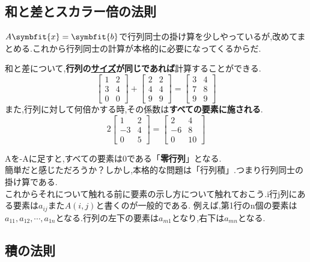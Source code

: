 \subsection{和と差とスカラー倍の法則}
$A\symbfit{x}=\symbfit{b}$で行列同士の掛け算を少しやっているが,改めてまとめる.これから行列同士の計算が本格的に必要になってくるからだ.
\begin{tcolorbox}[colframe=black!80,colback=white,title={行列和と行列差の計算可能な条件,スカラー倍の計算}]
和と差について,\textbf{行列の\hyperlink{size}{サイズ}が同じであれば}計算することができる.
\[
\begin{bmatrix}
    1 & 2 \\ 3 & 4 \\ 0 & 0
\end{bmatrix}
+
\begin{bmatrix}
    2 & 2 \\ 4 & 4 \\ 9 & 9
\end{bmatrix}
=
\begin{bmatrix}
    3 & 4 \\ 7 & 8 \\ 9 & 9
\end{bmatrix}
\]
また,行列に対して何倍かする時,その係数は\textbf{すべての要素に施される}.
\[
2\begin{bmatrix}
    1 & 2 \\ -3 & 4 \\ 0 & 5
\end{bmatrix}
=
\begin{bmatrix}
    2 & 4 \\ -6 & 8 \\ 0 & 10
\end{bmatrix}
\]
\end{tcolorbox}
Aを-Aに足すと,すべての要素は0である「\textbf{零行列}」となる.\\
簡単だと感じただろうか？しかし,本格的な問題は「行列積」.つまり行列同士の掛け算である.\\
これからそれについて触れる前に要素の示し方について触れておこう.i行j列にある要素は$a_{ij}$また$A(i,j)$と書くのが一般的である.
例えば,第1行のn個の要素は$a_{11},a_{12}, \cdots ,a_{1n}$となる.行列の左下の要素は$a_{m1}$となり,右下は$a_{mn}$となる.
\subsection{積の法則}
